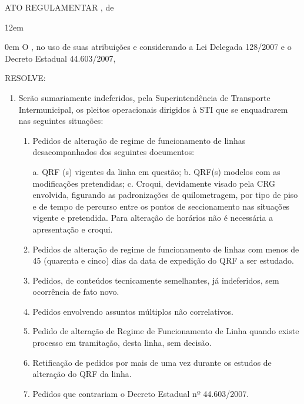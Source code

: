 \documentclass[a4paper,11pt]{report}
\begin{document}

\begin{center}
ATO REGULAMENTAR \NumeroAto, de \DataAssinatura
\end{center}

\leftskip12em
\textbf{\lipsum[1]}

\leftskip0em
O \CargoSignatario, no uso de suas atribuições e considerando a Lei Delegada 128/2007 e o Decreto Estadual 44.603/2007,

RESOLVE:

\begin{enumerate}[label=Art. \arabic*]
\item \label{itm:A5JT} Serão sumariamente indeferidos, pela Superintendência de Transporte Intermunicipal, os pleitos operacionais dirigidos à STI que se enquadrarem nas seguintes situações:

\begin{enumerate}[label=\roman*.]
\item \label{itm:3CK8} Pedidos de alteração de regime de funcionamento de linhas desacompanhados dos seguintes documentos:

a. QRF (s) vigentes da linha em questão;
b. QRF(s) modelos com as modificações pretendidas;
c. Croqui, devidamente visado pela CRG envolvida, figurando as padronizações de quilometragem, por tipo de piso e de tempo de percurso entre os pontos de seccionamento nas situações vigente e pretendida. Para alteração de horários não é necessária a apresentação e croqui.

\item \label{itm:6FZL} Pedidos de alteração de regime de funcionamento de linhas com menos de 45 (quarenta e cinco) dias da data de expedição do QRF a ser estudado.
\item \label{itm:3QJD} Pedidos, de conteúdos tecnicamente semelhantes, já indeferidos, sem ocorrência de fato novo.
\item \label{itm:WHLA} Pedidos envolvendo assuntos múltiplos não correlativos.
\item \label{itm:6WF3} Pedido de alteração de Regime de Funcionamento de Linha quando existe processo em tramitação, desta linha, sem decisão.
\item \label{itm:EUAC} Retificação de pedidos por mais de uma vez durante os estudos de alteração do QRF da linha.
\item \label{itm:NFZG} Pedidos que contrariam o Decreto Estadual nº 44.603/2007.
\end{enumerate}


\end{enumerate}
\end{document}
